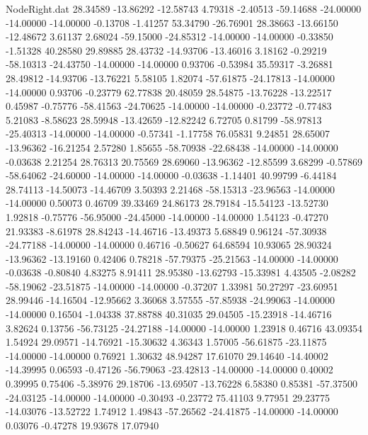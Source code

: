 \begin{filecontents}{NodeRight.dat}
  28.34589  -13.86292  -12.58743     4.79318   -2.40513  -59.14688  -24.00000  -14.00000  -14.00000   -0.13708   -1.41257   53.34790  -26.76901
  28.38663  -13.66150  -12.48672     3.61137    2.68024  -59.15000  -24.85312  -14.00000  -14.00000   -0.33850   -1.51328   40.28580   29.89885
  28.43732  -14.93706  -13.46016     3.18162   -0.29219  -58.10313  -24.43750  -14.00000  -14.00000    0.93706   -0.53984   35.59317   -3.26881
  28.49812  -14.93706  -13.76221     5.58105    1.82074  -57.61875  -24.17813  -14.00000  -14.00000    0.93706   -0.23779   62.77838   20.48059
  28.54875  -13.76228  -13.22517     0.45987   -0.75776  -58.41563  -24.70625  -14.00000  -14.00000   -0.23772   -0.77483    5.21083   -8.58623
  28.59948  -13.42659  -12.82242     6.72705    0.81799  -58.97813  -25.40313  -14.00000  -14.00000   -0.57341   -1.17758   76.05831    9.24851
  28.65007  -13.96362  -16.21254     2.57280    1.85655  -58.70938  -22.68438  -14.00000  -14.00000   -0.03638    2.21254   28.76313   20.75569
  28.69060  -13.96362  -12.85599     3.68299   -0.57869  -58.64062  -24.60000  -14.00000  -14.00000   -0.03638   -1.14401   40.99799   -6.44184
  28.74113  -14.50073  -14.46709     3.50393    2.21468  -58.15313  -23.96563  -14.00000  -14.00000    0.50073    0.46709   39.33469   24.86173
  28.79184  -15.54123  -13.52730     1.92818   -0.75776  -56.95000  -24.45000  -14.00000  -14.00000    1.54123   -0.47270   21.93383   -8.61978
  28.84243  -14.46716  -13.49373     5.68849    0.96124  -57.30938  -24.77188  -14.00000  -14.00000    0.46716   -0.50627   64.68594   10.93065
  28.90324  -13.96362  -13.19160     0.42406    0.78218  -57.79375  -25.21563  -14.00000  -14.00000   -0.03638   -0.80840    4.83275    8.91411
  28.95380  -13.62793  -15.33981     4.43505   -2.08282  -58.19062  -23.51875  -14.00000  -14.00000   -0.37207    1.33981   50.27297  -23.60951
  28.99446  -14.16504  -12.95662     3.36068    3.57555  -57.85938  -24.99063  -14.00000  -14.00000    0.16504   -1.04338   37.88788   40.31035
  29.04505  -15.23918  -14.46716     3.82624    0.13756  -56.73125  -24.27188  -14.00000  -14.00000    1.23918    0.46716   43.09354    1.54924
  29.09571  -14.76921  -15.30632     4.36343    1.57005  -56.61875  -23.11875  -14.00000  -14.00000    0.76921    1.30632   48.94287   17.61070
  29.14640  -14.40002  -14.39995     0.06593   -0.47126  -56.79063  -23.42813  -14.00000  -14.00000    0.40002    0.39995    0.75406   -5.38976
  29.18706  -13.69507  -13.76228     6.58380    0.85381  -57.37500  -24.03125  -14.00000  -14.00000   -0.30493   -0.23772   75.41103    9.77951
  29.23775  -14.03076  -13.52722     1.74912    1.49843  -57.26562  -24.41875  -14.00000  -14.00000    0.03076   -0.47278   19.93678   17.07940

\end{filecontents}

